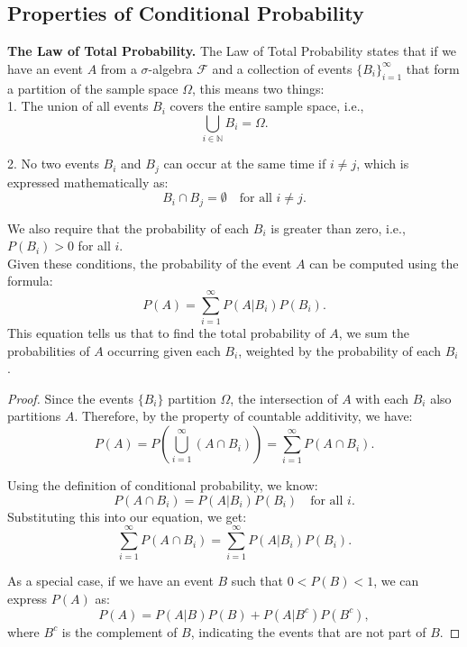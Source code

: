 \subsection{Properties of Conditional Probability}

\begin{theorem}
    \textbf{The Law of Total Probability.} The Law of Total Probability states that if we have an event \( A \) from a \(\sigma\)-algebra \( \mathcal{F} \) and a collection of events \( \{ B_i \}_{i=1}^{\infty} \) that form a partition of the sample space \( \Omega \), this means two things:\\

    1. The union of all events \( B_i \) covers the entire sample space, i.e., 
       \[
       \bigcup_{i \in \mathbb{N}} B_i = \Omega.
       \]
    
    2. No two events \( B_i \) and \( B_j \) can occur at the same time if \( i \neq j \), which is expressed mathematically as:
       \[
       B_i \cap B_j = \emptyset \quad \text{for all } i \neq j.
       \]
    
       We also require that the probability of each \( B_i \) is greater than zero, i.e., \( P(B_i) > 0 \) for all \( i \).\\

       Given these conditions, the probability of the event \( A \) can be computed using the formula:
       \[
       P(A) = \sum_{i=1}^{\infty} P(A | B_i) P(B_i).
       \]
       This equation tells us that to find the total probability of \( A \), we sum the probabilities of \( A \) occurring given each \( B_i \), weighted by the probability of each \( B_i \).
\end{theorem}

\begin{proof}
    Since the events \( \{ B_i \} \) partition \( \Omega \), the intersection of \( A \) with each \( B_i \) also partitions \( A \). Therefore, by the property of countable additivity, we have:
\[
P(A) = P\left( \bigcup_{i=1}^{\infty} (A \cap B_i) \right) = \sum_{i=1}^{\infty} P(A \cap B_i).
\]

Using the definition of conditional probability, we know:
\[
P(A \cap B_i) = P(A | B_i) P(B_i) \quad \text{for all } i.
\]
Substituting this into our equation, we get:
\[
\sum_{i=1}^{\infty} P(A \cap B_i) = \sum_{i=1}^{\infty} P(A | B_i) P(B_i).
\]

As a special case, if we have an event \( B \) such that \( 0 < P(B) < 1 \), we can express \( P(A) \) as:
\[
P(A) = P(A | B) P(B) + P(A | B^c) P(B^c),
\]
where \( B^c \) is the complement of \( B \), indicating the events that are not part of \( B \).
\end{proof}

